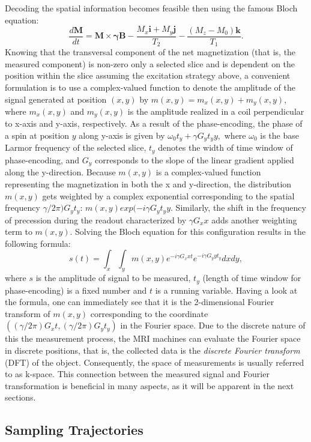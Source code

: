 Decoding the spatial information becomes feasible then using the famous Bloch equation:
\[\frac{d\mathbf{M}}{dt} = \mathbf{M} \times \boldsymbol{\gamma} \mathbf{B} - \frac{M_x\mathbf{i} + M_y\mathbf{j}}{T_2} - \frac{(M_z - M_0)\mathbf{k}}{T_1}.\]
Knowing that the transversal component of the net magnetization (that is, the measured component) is non-zero only a selected slice and is dependent on the position within the slice assuming the excitation strategy above, a convenient formulation is to use a complex-valued function to denote the amplitude of the signal generated at position $(x,y)$ by $m(x,y) = m_x(x,y) + m_y(x,y)$, where $m_x(x,y)$ and $m_y(x,y)$ is the amplitude realized in a coil perpendicular to x-axis and y-axis, respectively. As a result of the phase-encoding, the phase of a spin at position $y$ along y-axis is given by $\omega_0 t_y + \gamma G_y t_y y,$ where $\omega_0$ is the base Larmor frequency of the selected slice, $t_y$ denotes the width of time window of phase-encoding, and $G_y$ corresponds to the slope of the linear gradient applied along the y-direction. Because $m(x,y)$ is a complex-valued function representing the magnetization in both the x and y-direction, the distribution $m(x,y)$ gets weighted by a complex exponential corresponding to the spatial frequency $\gamma/2\pi)G_y t_y$: $m(x,y)exp(-i\gamma G_y t_y y$. Similarly, the shift in the frequency of precession during the readout characterized by $\gamma G_x x$ adds another weighting term to $m(x,y)$. Solving the Bloch equation for this configuration results in the following formula:
\[s(t) = \int_x \int_y m(x,y) e^{-i\gamma G_x x t} e^{-i\gamma G_y y t_y} dx dy,\]
where $s$ is the amplitude of signal to be measured, $t_y$ (length of time window for phase-encoding) is a fixed number and $t$ is a running variable. Having a look at the formula, one can immediately see that it is the 2-dimensional Fourier transform of $m(x,y)$ corresponding to the coordinate $((\gamma/2\pi)G_x t, (\gamma/2\pi)G_y t_y)$ in the Fourier space. Due to the discrete nature of this the measurement process, the MRI machines can evaluate the Fourier space in discrete positions, that is, the collected data is the \textit{discrete Fourier transform} (DFT) of the object. Consequently, the space of measurements is usually referred to as k-space. This connection between the measured signal and Fourier transformation is beneficial in many aspects, as it will be apparent in the next sections.

\subsection{Sampling Trajectories}

